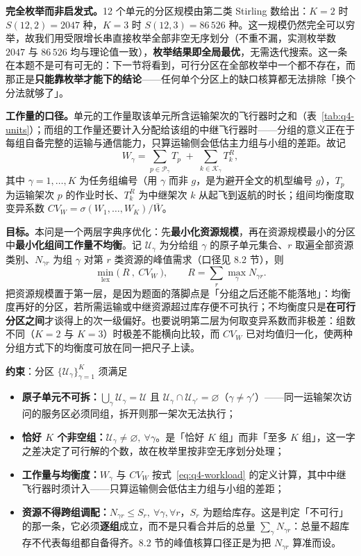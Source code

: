 \textbf{完全枚举而非启发式。}12 个单元的分区规模由第二类 Stirling 数给出：$K=2$ 时 $S(12,2)=2047$ 种，$K=3$ 时 $S(12,3)=86\,526$ 种。这一规模仍然完全可以穷举，故我们用受限增长串直接枚举全部非空无序划分（不重不漏，实测枚举数 $2047$ 与 $86\,526$ 均与理论值一致），\textbf{枚举结果即全局最优}，无需迭代搜索。这一条在本题不是可有可无的：下一节将看到，可行分区在全部枚举中一个都不存在，而那正是\textbf{只能靠枚举才能下的结论}——任何单个分区上的缺口核算都无法排除「换个分法就够了」。

\textbf{工作量的口径。}单元的工作量取该单元所含运输架次的飞行器时之和（表~\ref{tab:q4-units}）；而组的工作量还要计入分配给该组的中继飞行器时——分组的意义正在于每组自备完整的运输与通信能力，只算运输侧会低估主力组与小组的差距。故记
\begin{equation}
	W_\gamma=\sum_{p\in \mathcal{P}_\gamma} T_p \;+\; \sum_{k\in \mathcal{K}_\gamma} T^{R}_{k},
	\label{eq:q4-workload}
\end{equation}
其中 $\gamma=1,\dots,K$ 为任务组编号（用 $\gamma$ 而非 $g$，是为避开全文的机型编号 $g$），$T_p$ 为运输架次 $p$ 的作业时长、$T^{R}_{k}$ 为中继架次 $k$ 从起飞到返航的时长；组间均衡度取变异系数 $CV_W=\sigma(W_1,\dots,W_K)/\bar W$。

\textbf{目标。}本问是一个两层字典序优化：先\textbf{最小化资源规模}，再在资源规模最小的分区中\textbf{最小化组间工作量不均衡}。记 $\mathcal{U}_\gamma$ 为分给组 $\gamma$ 的原子单元集合、$r$ 取遍全部资源类别、$N_{\gamma r}$ 为组 $\gamma$ 对第 $r$ 类资源的峰值需求（口径见 8.2 节），则
\begin{equation}
	\min_{\mathrm{lex}}\bigl(\ R\ ,\ CV_W\ \bigr),\qquad
	R=\sum_{r}\max_{\gamma}N_{\gamma r}.
	\label{eq:q4-lex}
\end{equation}
把资源规模置于第一层，是因为题面的落脚点是「分组之后还能不能落地」：均衡度再好的分区，若所需运输或中继资源超过库存便不可执行；不均衡度只是\textbf{在可行分区之间}才谈得上的次一级偏好。也要说明第二层为何取变异系数而非极差：组数不同（$K=2$ 与 $K=3$）时极差不能横向比较，而 $CV_W$ 已对均值归一化，使两种分组方式下的均衡度可放在同一把尺子上读。

\textbf{约束}：分区 $\{\mathcal{U}_\gamma\}_{\gamma=1}^{K}$ 须满足
\begin{itemize}
	\item[(C1)] \textbf{原子单元不可拆：}$\bigcup_{\gamma}\mathcal{U}_\gamma=\mathcal{U}$ 且 $\mathcal{U}_\gamma\cap\mathcal{U}_{\gamma'}=\varnothing$（$\gamma\ne\gamma'$）——同一运输架次访问的服务区必须同组，拆开则那一架次无法执行；
	\item[(C2)] \textbf{恰好 $K$ 个非空组：}$\mathcal{U}_\gamma\ne\varnothing,\ \forall\gamma$。是「恰好 $K$ 组」而非「至多 $K$ 组」，这一字之差决定了可行解的个数，故在枚举里按非空无序划分处理；
	\item[(C3)] \textbf{工作量与均衡度：}$W_\gamma$ 与 $CV_W$ 按式~\eqref{eq:q4-workload} 的定义计算，其中中继飞行器时须计入——只算运输侧会低估主力组与小组的差距；
	\item[(C4)] \textbf{资源不得跨组调配：}$N_{\gamma r}\le S_r,\ \forall\gamma,\forall r$，$S_r$ 为题给库存。这是判定「不可行」的那一条，它必须\textbf{逐组}成立，而不是只看合并后的总量 $\sum_\gamma N_{\gamma r}$：总量不超库存不代表每组都自备得齐。8.2 节的峰值核算口径正是为把 $N_{\gamma r}$ 算准而设。
\end{itemize}

